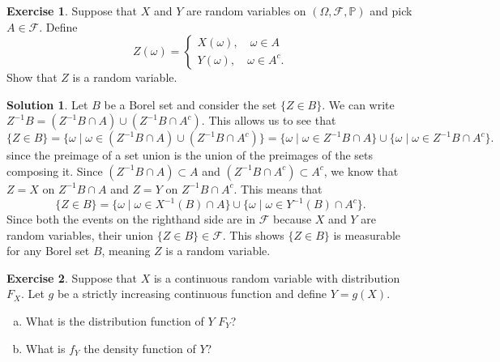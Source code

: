 \documentclass[12pt]{article}
\newcommand{\Prob}{\mathbb{P}}
\newcommand{\calF}{\mathcal{F}}
\theoremstyle{definition}
\newtheorem{exer}{Exercise}
\newtheorem{sol}{Solution}
\theoremstyle{remark}
\begin{document}
\begin{exer}
    Suppose that $X$ and $Y$ are random variables on $(\Omega, \calF, \Prob)$ and pick $A\in \calF$. Define
    \begin{equation}
        Z(\omega) = \begin{cases}
            X(\omega), \quad \omega\in A \\
            Y(\omega), \quad \omega\in A^c.
        \end{cases}
    \end{equation}
    Show that $Z$ is a random variable.
\end{exer}
\begin{sol}
    Let $B$ be a Borel set and consider the set $\{ Z \in B\}$. We can write $Z^{-1}B = (Z^{-1}B\cap A) \cup (Z^{-1}B \cap A^c)$. This allows us to see that 
\begin{equation}
    \{ Z \in B\} = \{\omega\mid \omega\in (Z^{-1}B\cap A) \cup (Z^{-1}B \cap A^c) \}= \{\omega\mid \omega\in Z^{-1}B\cap A \} \cup \{\omega \mid \omega \in Z^{-1}B\cap A^c \}.
\end{equation}
since the preimage of a set union is the union of the preimages of the sets composing it. Since $ (Z^{-1}B\cap A)\subset A$ and $(Z^{-1}B\cap A^c) \subset A^c$, we know that $Z = X$ on $Z^{-1}B\cap A$ and $Z=Y$ on $Z^{-1}B\cap A^c$. This means that
\begin{equation}
    \{ Z\in B\} = \{\omega\mid \omega \in X^{-1}(B)\cap A \} \cup \{\omega\mid\omega \in Y^{-1}(B)\cap A^c\}.
\end{equation}
Since both the events on the righthand side are in $\calF$ because $X$ and $Y$ are random variables, their union $\{Z\in B\}\in\calF$. This shows $\{ Z\in B\}$ is measurable for any Borel set $B$, meaning $Z$ is a random variable.
\end{sol}

\newpage 
\begin{exer}
    Suppose that $X$ is a continuous random variable with distribution $F_X$. Let $g$ be a strictly increasing continuous function and define $Y=g(X)$. 

    \begin{enumerate}[a)]
        \item What is the distribution function of $Y$ $F_Y$?
        \item What is $f_Y$ the density function of $Y$?
    \end{enumerate}
\end{exer}
\end{document}

